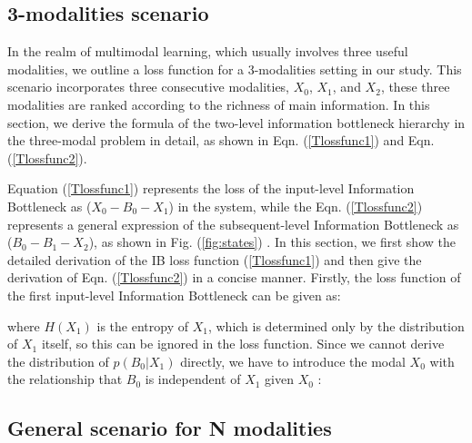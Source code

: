 \documentclass{article} %
\begin{document}
\subsection{3-modalities scenario}
\label{apsec:3-hop}
In the realm of multimodal learning, which usually involves three useful modalities, we outline a loss function for a 3-modalities setting in our study. This scenario incorporates three consecutive modalities, $X_0$, $X_{1}$, and $X_{2}$, these three modalities are ranked according to the richness of main information. In this section, we derive the formula of the two-level information bottleneck hierarchy in the three-modal problem in detail, as shown in Eqn. (\ref{Tlossfunc1}) and Eqn. (\ref{Tlossfunc2}).

Equation (\ref{Tlossfunc1}) represents the loss of the input-level Information Bottleneck as ($X_{0}-B_{0}-X_{1}$) in the system, while the Eqn. (\ref{Tlossfunc2}) represents a general expression of the subsequent-level Information Bottleneck as ($B_{0}-B_{1}-X_{2}$), as shown in Fig. (\ref{fig:states}) . In this section, we first show the detailed derivation of the IB loss function (\ref{Tlossfunc1}) and then give the derivation of Eqn. (\ref{Tlossfunc2}) in a concise manner. Firstly, the loss function of the first input-level Information Bottleneck can be given as:



where $H\left (X_{1} \right )$ is the entropy of $X_{1}$, which is determined only by the distribution of $X_{1}$ itself, so this can be ignored in the loss function. Since we cannot derive the distribution of $p\left ( B_0|X_{1} \right ) $ directly, we have to introduce the modal $X_{0}$ with the relationship that $B_{0}$ is independent of $X_{1}$ given $X_{0}$ :






\subsection{General scenario for N modalities}
\label{apsec:general}
\end{document}
